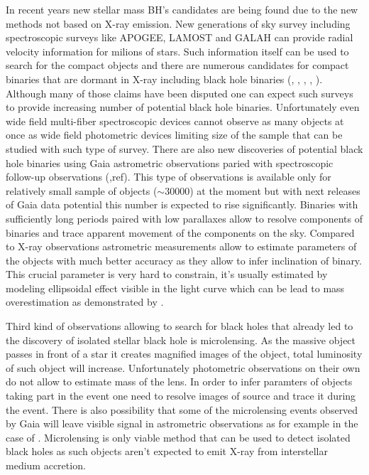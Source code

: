 \documentclass{pracalicmgr}
\begin{document}
\hspace{1cm} In recent years new stellar mass BH's candidates are being found due to the new methods not based on X-ray emission. New generations of sky survey 
including spectroscopic surveys like APOGEE, LAMOST and GALAH can provide radial velocity information for milions of stars. Such 
information itself can be used to search for the compact objects and there are numerous candidates for compact binaries that are dormant in 
X-ray including black hole binaries (\citet*{liu_wide_2019}, \citet*{jayasinghe_asas-sn_2019}, \citet*{shenar_x-ray-quiet_2022}, \citet{lennon_vlt-flames_2022}, \citet*{thompson_noninteracting_2019}).
Although many of those claims have been disputed 
one can expect such surveys to provide increasing number of potential black hole binaries. Unfortunately even wide field multi-fiber spectroscopic 
devices cannot observe as many objects at once as wide field photometric devices limiting size of the sample that can be studied with such type of 
survey. There are also new discoveries of potential black hole binaries using Gaia astrometric observations paried with spectroscopic follow-up 
observations (\citet*{el-badry_sun-like_2022},ref). This type of observations is available only for relatively small sample of objects ($\sim 30000$) 
at the moment but with next releases of Gaia data potential this number is expected to rise significantly. Binaries with sufficiently long periods 
paired with low parallaxes allow to resolve components of binaries and trace apparent movement of the components on the sky. 
Compared to X-ray observations astrometric measurements allow to estimate parameters of the objects with much better accuracy as they allow to infer inclination of binary. 
This crucial parameter is very hard to constrain, it's usually estimated by modeling ellipsoidal effect visible in the light curve which 
can be lead to mass overestimation as demonstrated by \citep{kreidberg_mass_2012}. 

\hspace{1cm} Third kind of observations allowing to search for black holes that already led to the discovery of isolated stellar black hole \citep{sahu_isolated_2022}
is microlensing. As the massive object passes in front of a star it creates magnified images of the object, total luminosity of such object will 
increase. Unfortunately photometric observations on their own do not allow to estimate mass of the lens. In order to infer paramters of objects taking 
part in the event one need to resolve images of source and trace it during the event. 
There is also possibility that some of the microlensing events observed by Gaia will leave visible signal in astrometric 
observations as for example in the case of \citet{kruszynska_lens_2022}. Microlensing is only viable method that can be used to detect
isolated black holes as such objects aren't expected to emit X-ray from interstellar medium accretion. 
\end{document}
